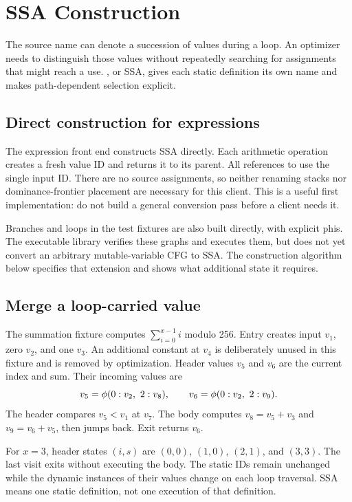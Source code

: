 \chapter{SSA Construction}
\label{ch:pebble-ssa}

The source name  can denote a succession of values during a loop.
An optimizer needs to distinguish those values without repeatedly searching for assignments that might reach a use.
, or SSA, gives each static definition its own name and makes path-dependent selection explicit.

\section{Direct construction for expressions}
\label{sec:pebble-direct-ssa}
The expression front end constructs SSA directly.
Each arithmetic operation creates a fresh value ID and returns it to its parent.
All references to  use the single input ID.
There are no source assignments, so neither renaming stacks nor dominance-frontier placement are necessary for this client.
This is a useful first implementation: do not build a general conversion pass before a client needs it.

Branches and loops in the test fixtures are also built directly, with explicit phis.
The executable library verifies these graphs and executes them, but does not yet convert an arbitrary mutable-variable CFG to SSA.
The construction algorithm below specifies that extension and shows what additional state it requires.

\section{Merge a loop-carried value}
\label{sec:pebble-loop-ssa}
The summation fixture computes $\sum_{i=0}^{x-1}i$ modulo 256.
Entry creates input $v_1$, zero $v_2$, and one $v_3$.
An additional constant at $v_4$ is deliberately unused in this fixture and is removed by optimization.
Header values $v_5$ and $v_6$ are the current index and sum.
Their incoming values are
\[
v_5=\phi(0:v_2,\ 2:v_8),\qquad
v_6=\phi(0:v_2,\ 2:v_9).
\]
The header compares $v_5<v_1$ at $v_7$.
The body computes $v_8=v_5+v_3$ and $v_9=v_6+v_5$, then jumps back.
Exit returns $v_6$.

For $x=3$, header states $(i,s)$ are $(0,0)$, $(1,0)$, $(2,1)$, and $(3,3)$.
The last visit exits without executing the body.
The static IDs remain unchanged while the dynamic instances of their values change on each loop traversal.
SSA means one static definition, not one execution of that definition.

